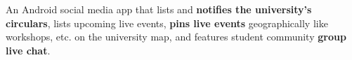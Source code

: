 \documentclass[]{resume-openfont}
\begin{document}
\begin{minipage}[t]{0.66\textwidth}
An Android social media app that lists and \textbf{notifies the university's circulars}, lists upcoming live events, \textbf{pins live events} geographically like workshops, etc. on the university map, and features student community \textbf{group live chat}.
\sectionsep

\end{minipage} 
\end{document}
